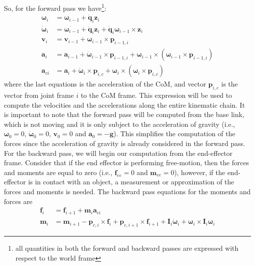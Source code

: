\documentclass[11pt]{article}
\begin{document}
 So, for the forward pass we have\footnote{all quantities in both the forward and backward passes are expressed with respect to the world frame}:
\begin{align*}
	\boldsymbol{\omega}_i &= \boldsymbol{\omega}_{i-1} + \dot{\mathbf{q}}_i \mathbf{z}_i \\
%	
	\dot{\boldsymbol{\omega}}_i &= \dot{\boldsymbol{\omega}_{i-1}} + \ddot{\mathbf{q}}_i \mathbf{z}_i + \dot{\mathbf{q}}_i \boldsymbol{\omega}_{i-1} \times \mathbf{z}_i \\
%	
	\mathbf{v}_i &= \mathbf{v}_{i-1} + \boldsymbol{\omega}_{i-1} \times \mathbf{p}_{i-1,i} \\
%	
	\mathbf{a}_i &= \mathbf{a}_{i-1} + \dot{\boldsymbol{\omega}}_{i-1} \times \mathbf{p}_{i-1,i} + \boldsymbol{\omega}_{i-1} 	\times (\boldsymbol{\omega}_{i-1} \times \mathbf{p}_{i-1,i}) \\
%	
	\mathbf{a}_{ci} &= \mathbf{a}_{i} + \dot{\boldsymbol{\omega}}_{i} \times \mathbf{p}_{i,c} + \boldsymbol{\omega}_{i} 	\times (\boldsymbol{\omega}_{i} \times \mathbf{p}_{i,c})
\end{align*} 
where the last equations is the acceleration of the CoM, and vector $\mathbf{p}_{i,c}$ is the vector from joint frame $i$ to the CoM frame.
This expression will be used to compute the velocities and the accelerations  along the entire  kinematic chain.
It is important to note that the forward pass will be computed from the base link, which is not moving and it is only subject to the acceleration of gravity (i.e., $\boldsymbol{\omega}_0 = 0$, 
$\dot{\boldsymbol{\omega}}_0 = 0$, $\mathbf{v}_0 = 0$ and $\mathbf{a}_0 = -\mathbf{g}$). This simplifies the computation of the forces since the acceleration of gravity is already considered in the forward pass. 
For the backward pass, we will begin our computation from the end-effector frame. Consider that if the end effector is performing free-motion, then the forces and moments are equal to zero (i.e., $\mathbf{f}_{ee} 
=0$ and $\mathbf{m}_{ee} = 0$), however, if the end-effector is in contact with an object, a measurement or approximation of the forces and moments is needed. The backward pass equations for the moments and forces 
are
\begin{align*}
	\mathbf{f}_i &= \mathbf{f}_{i+1} + \mathbf{m}_i\mathbf{a}_{ci} \\
	\mathbf{m}_i &= \mathbf{m}_{i+1} - \mathbf{p}_{c,i} \times \mathbf{f}_i + \mathbf{p}_{c,i+1} \times \mathbf{f}_{i+1} + \mathbf{I}_i \dot{\boldsymbol{\omega}}_i + \boldsymbol{\omega}_i  \times \mathbf{I}_i \boldsymbol{\omega}_i
\end{align*}
\end{document}
